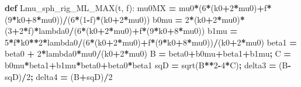 \documentclass[
  a4paper,
  numbers=noendperiod,
  DIV=12]{scrreprt}
\newenvironment{Shaded}{\begin{snugshade}}{\end{snugshade}}
\newcommand{\DecValTok}[1]{\textcolor[rgb]{0.00,0.00,0.81}{#1}}
\newcommand{\KeywordTok}[1]{\textcolor[rgb]{0.13,0.29,0.53}{\textbf{#1}}}
\newcommand{\NormalTok}[1]{#1}
\newcommand{\OperatorTok}[1]{\textcolor[rgb]{0.81,0.36,0.00}{\textbf{#1}}}
\begin{document}
\begin{Shaded}
\begin{Highlighting}[]
\KeywordTok{def}\NormalTok{ Lmu\_sph\_rig\_ML\_MAX(t, f):}
\NormalTok{    mu0MX }\OperatorTok{=}\NormalTok{ mu0}\OperatorTok{*}\NormalTok{(}\DecValTok{6}\OperatorTok{*}\NormalTok{(k0}\OperatorTok{+}\DecValTok{2}\OperatorTok{*}\NormalTok{mu0)}\OperatorTok{+}\NormalTok{f}\OperatorTok{*}\NormalTok{(}\DecValTok{9}\OperatorTok{*}\NormalTok{k0}\OperatorTok{+}\DecValTok{8}\OperatorTok{*}\NormalTok{mu0))}\OperatorTok{/}\NormalTok{(}\DecValTok{6}\OperatorTok{*}\NormalTok{(}\DecValTok{1}\OperatorTok{{-}}\NormalTok{f)}\OperatorTok{*}\NormalTok{(k0}\OperatorTok{+}\DecValTok{2}\OperatorTok{*}\NormalTok{mu0))}
\NormalTok{    b0mu  }\OperatorTok{=} \DecValTok{2}\OperatorTok{*}\NormalTok{(k0}\OperatorTok{+}\DecValTok{2}\OperatorTok{*}\NormalTok{mu0)}\OperatorTok{*}\NormalTok{(}\DecValTok{3}\OperatorTok{+}\DecValTok{2}\OperatorTok{*}\NormalTok{f)}\OperatorTok{*}\NormalTok{lambda0}\OperatorTok{/}\NormalTok{(}\DecValTok{6}\OperatorTok{*}\NormalTok{(k0}\OperatorTok{+}\DecValTok{2}\OperatorTok{*}\NormalTok{mu0)}\OperatorTok{+}\NormalTok{f}\OperatorTok{*}\NormalTok{(}\DecValTok{9}\OperatorTok{*}\NormalTok{k0}\OperatorTok{+}\DecValTok{8}\OperatorTok{*}\NormalTok{mu0))}
\NormalTok{    b1mu  }\OperatorTok{=} \DecValTok{5}\OperatorTok{*}\NormalTok{f}\OperatorTok{*}\NormalTok{k0}\OperatorTok{**}\DecValTok{2}\OperatorTok{*}\NormalTok{lambda0}\OperatorTok{/}\NormalTok{(}\DecValTok{6}\OperatorTok{*}\NormalTok{(k0}\OperatorTok{+}\DecValTok{2}\OperatorTok{*}\NormalTok{mu0)}\OperatorTok{+}\NormalTok{f}\OperatorTok{*}\NormalTok{(}\DecValTok{9}\OperatorTok{*}\NormalTok{k0}\OperatorTok{+}\DecValTok{8}\OperatorTok{*}\NormalTok{mu0))}\OperatorTok{/}\NormalTok{(k0}\OperatorTok{+}\DecValTok{2}\OperatorTok{*}\NormalTok{mu0)}
\NormalTok{    beta1 }\OperatorTok{=}\NormalTok{ beta0 }\OperatorTok{+} \DecValTok{2}\OperatorTok{*}\NormalTok{lambda0}\OperatorTok{*}\NormalTok{mu0}\OperatorTok{/}\NormalTok{(k0}\OperatorTok{+}\DecValTok{2}\OperatorTok{*}\NormalTok{mu0)}
\NormalTok{    B }\OperatorTok{=}\NormalTok{ beta0}\OperatorTok{+}\NormalTok{b0mu}\OperatorTok{+}\NormalTok{beta1}\OperatorTok{+}\NormalTok{b1mu}\OperatorTok{;}\NormalTok{  C }\OperatorTok{=}\NormalTok{ b0mu}\OperatorTok{*}\NormalTok{beta1}\OperatorTok{+}\NormalTok{b1mu}\OperatorTok{*}\NormalTok{beta0}\OperatorTok{+}\NormalTok{beta0}\OperatorTok{*}\NormalTok{beta1}
\NormalTok{    sqD }\OperatorTok{=}\NormalTok{ sqrt(B}\OperatorTok{**}\DecValTok{2}\OperatorTok{{-}}\DecValTok{4}\OperatorTok{*}\NormalTok{C)}\OperatorTok{;}\NormalTok{  delta3 }\OperatorTok{=}\NormalTok{ (B}\OperatorTok{{-}}\NormalTok{sqD)}\OperatorTok{/}\DecValTok{2}\OperatorTok{;}\NormalTok{  delta4 }\OperatorTok{=}\NormalTok{ (B}\OperatorTok{+}\NormalTok{sqD)}\OperatorTok{/}\DecValTok{2}

\end{Highlighting}
\end{Shaded}
\end{document}
